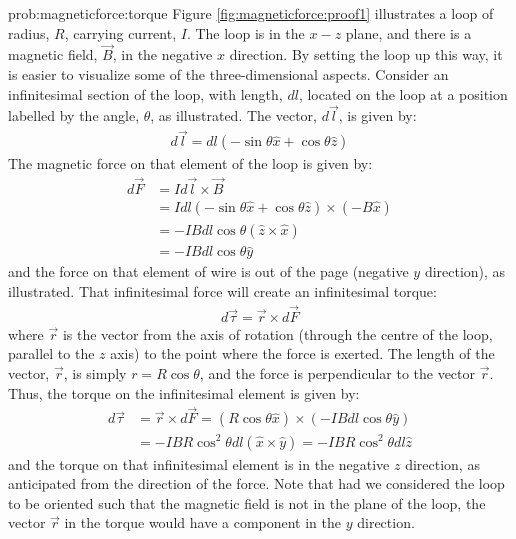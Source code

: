 \begin{solution}{prob:magneticforce:torque}\label{soln:magneticforce:torque}
Figure \ref{fig:magneticforce:proof1} illustrates a loop of radius, $R$, carrying current, $I$. The loop is in the $x-z$ plane, and there is a magnetic field, $\vec B$, in the negative $x$ direction. By setting the loop up this way, it is easier to visualize some of the three-dimensional aspects.
Consider an infinitesimal section of the loop, with length, $dl$, located on the loop at a position labelled by the angle, $\theta$, as illustrated. The vector, $d\vec l$, is given by:
\begin{align*}
d\vec l  = dl (-\sin\theta \hat x + \cos\theta \hat z)
\end{align*}
The magnetic force on that element of the loop is given by:
\begin{align*}
d\vec F &=Id\vec l \times \vec B\\
&=Idl(-\sin\theta \hat x + \cos\theta \hat z) \times (-B\hat x)\\
&=-IBdl\cos\theta (\hat z \times \hat x)\\
&=-IBdl\cos\theta\hat y
\end{align*}
and the force on that element of wire is out of the page (negative $y$ direction), as illustrated. That infinitesimal force will create an infinitesimal torque:
\begin{align*}
d\vec \tau = \vec r \times d\vec F
\end{align*}
where $\vec r$ is the vector from the axis of rotation (through the centre of the loop, parallel to the $z$ axis) to the point where the force is exerted. The length of the vector, $\vec r$, is simply $r=R\cos\theta$, and the force is perpendicular to the vector $\vec r$. Thus, the torque on the infinitesimal element is given by:
\begin{align*}
d\vec \tau &= \vec r \times d\vec F= (R\cos\theta \hat x)\times (-IBdl\cos\theta\hat y)\\
&=-IBR\cos^2\theta dl (\hat x \times \hat y)=-IBR\cos^2\theta dl \hat z
\end{align*}
and the torque on that infinitesimal element is in the negative $z$ direction, as anticipated from the direction of the force. Note that had we considered the loop to be oriented such that the magnetic field is not in the plane of the loop, the vector $\vec r$ in the torque would have a component in the $y$ direction. 


\end{solution}
